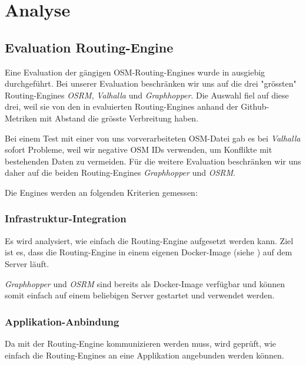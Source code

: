 \section{Analyse}
\label{sec:Analyse}

\subsection{Evaluation Routing-Engine}
\label{analyse:Evaluation Routing-Engine}
Eine Evaluation der gängigen \ac{OSM}-Routing-Engines wurde in \cite{eval_routing_engine} ausgiebig durchgeführt. Bei unserer Evaluation beschränken wir uns auf die drei "grössten" Routing-Engines \emph{OSRM}\cite{osrm}, \emph{Valhalla}\cite{valhalla} und \emph{Graphhopper}\cite{graphhopper}. Die Auswahl fiel auf diese drei, weil sie von den in \cite{eval_routing_engine} evaluierten Routing-Engines anhand der Github-Metriken mit Abstand die grösste Verbreitung haben.

Bei einem Test mit einer von uns vorverarbeiteten OSM-Datei gab es bei \emph{Valhalla} sofort Probleme, weil wir negative OSM IDs verwenden, um Konflikte mit bestehenden Daten zu vermeiden. Für die weitere Evaluation beschränken wir uns daher auf die beiden Routing-Engines \emph{Graphhopper} und \emph{OSRM}.

Die Engines werden an folgenden Kriterien gemessen:

\subsubsection{Infrastruktur-Integration}
\label{analyse:Infrastruktur-Integration}
Es wird analysiert, wie einfach die Routing-Engine aufgesetzt werden kann. Ziel ist es, dass die Routing-Engine in einem eigenen Docker-Image (siehe ) auf dem Server läuft.

\emph{Graphhopper} und \emph{OSRM} sind bereits als Docker-Image verfügbar und können somit einfach auf einem beliebigen Server gestartet und verwendet werden.


\subsubsection{Applikation-Anbindung}
\label{analyse:Applikation-Anbindung}
Da mit der Routing-Engine kommunizieren werden muss, wird geprüft, wie einfach die Routing-Engines an eine Applikation angebunden werden können.

